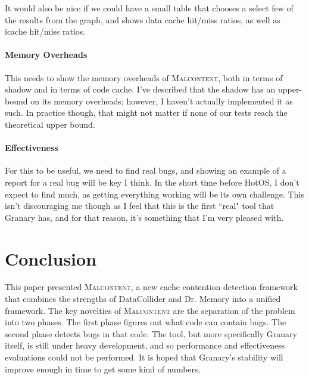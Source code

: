 \documentclass[letterpaper,twocolumn,10pt]{article}
\newcommand{\TextToolname}{Malcontent}
\newcommand{\Toolname}{\textsc{\TextToolname{}}}
\begin{document}
It would also be nice if we could have a small table that chooses a select few of the results from the graph, and shows data cache
hit/miss ratios, as well as icache hit/miss ratios.

\paragraph{Memory Overheads}
This needs to show the memory overheads of \Toolname{}, both in terms of shadow and in terms of code cache. I've described that
the shadow has an upper-bound on its memory overheads; however, I haven't actually implemented it as such. In practice though,
that might not matter if none of our tests reach the theoretical upper bound.

\paragraph{Effectiveness}
For this to be useful, we need to find real bugs, and showing an example of a report for a real bug will be key I think. In the short
time before HotOS, I don't expect to find much, as getting everything working will be its own challenge. This isn't discouraging me
though as I feel that this is the first ``real" tool that Granary has, and for that reason, it's something that I'm very pleased with.

\section{Conclusion}
This paper presented \Toolname{}, a new cache contention detection framework that combines the strengths of DataCollider and
Dr. Memory into a unified framework. The key novelties of \Toolname{} are the separation of the problem into two phases. The
first phase figures out what code can contain bugs. The second phase detects bugs in that code. The tool, but more specifically
Granary itself, is still under heavy development, and so performance and effectiveness evaluations could not be performed. It is
hoped that Granary's stability will improve enough in time to get some kind of numbers.
\end{document}
